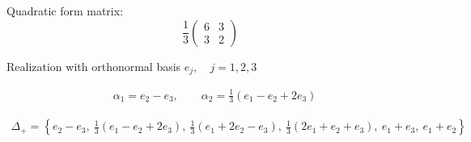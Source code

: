 \documentclass[12pt]{article}
\begin{document}
Quadratic form matrix:
\[\frac{1}{3}
\left(
\begin{array}{cc}
 6& 3 \\
 3& 2
\end{array}
\right)
\]

Realization with orthonormal basis $e_j,\quad j=1,2,3$

\begin{align*}
  &\alpha_1=e_2-e_3,\qquad
  \alpha_2=\frac13(e_1-e_2+2e_3)
\end{align*}

\begin{align*}
 \Delta_{+}=\left\{e_2-e_3,\ \frac13(e_1-e_2+2e_3),\ \frac13(e_1+2e_2-e_3),\
   \frac13(2e_1+e_2+e_3),\ e_1+e_3,\ e_1+e_2
  \right\}
\end{align*}
\end{document}
